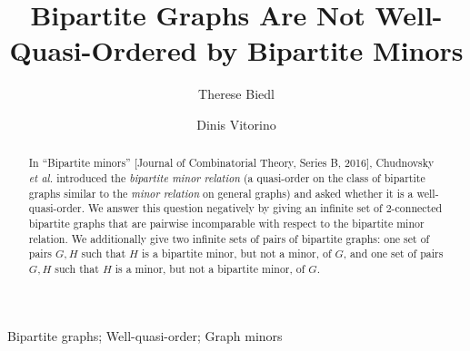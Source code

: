 \documentclass[a4paper,preprint,12pt]{elsarticle}
\newcommand{\etal}{\textit{et al.} }
\begin{document}
\begin{abstract}
    In \enquote{Bipartite minors} [Journal of Combinatorial Theory, Series B, 2016], Chudnovsky \etal introduced the \emph{bipartite minor relation} (a quasi-order on the class of bipartite graphs  similar
    to the \emph{minor relation} on general graphs) and asked whether it is a well-quasi-order.
    We answer this question negatively by giving an infinite set of $2$-connected bipartite graphs that are pairwise incomparable with respect to the bipartite minor relation.
    We additionally give two infinite sets 
    of pairs of bipartite graphs: one set of pairs $G,H$ such that $H$ is a bipartite minor, but not a minor, of $G$, and one set of pairs $G,H$ such that  $H$ is a minor, but not a bipartite minor, of $G$.
\end{abstract}
\begin{keyword}
    Bipartite graphs; Well-quasi-order; Graph minors
\end{keyword}

\begin{frontmatter}
    \title{Bipartite Graphs Are Not Well-Quasi-Ordered by Bipartite Minors}

    \author[1]{Therese Biedl}
    
    \author[2]{Dinis Vitorino}
    

    
\end{frontmatter}
\end{document}
